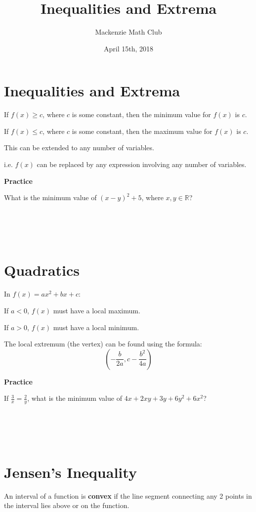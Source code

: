 

\title{Inequalities and Extrema}
\author{Mackenzie Math Club}
\date{April 15th, 2018}




\section{Inequalities and Extrema}
If $f(x) \geq c$, where $c$ is some constant, then the minimum value for $f(x)$ is $c$.

If $f(x) \leq c$, where $c$ is some constant, then the maximum value for $f(x)$ is $c$.

This can be extended to any number of variables.

i.e. $f(x)$ can be replaced by any expression involving any number of variables.

\textbf{Practice}

What is the minimum value of $(x - y)^2 + 5$, where $x, y \in \mathbb{R}$?
\\\\\\\\\\

\section{Quadratics}
In $f(x) = ax^2 + bx + c$:

If $a < 0$, $f(x)$ must have a local maximum.

If $a > 0$, $f(x)$ must have a local minimum.

The local extremum (the vertex) can be found using the formula:
\[\left( -\frac{b}{2a}, c - \frac{b^2}{4a} \right) \]

\textbf{Practice}

If $\frac{3}{x} = \frac{2}{y}$, what is the minimum value of $4x + 2xy + 3y + 6y^2 + 6x^2$?
\\\\\\\\\\
\newpage

\section{Jensen's Inequality}
An interval of a function is \textbf{convex} if the line segment connecting any 2 points in the interval lies above or on the function.

